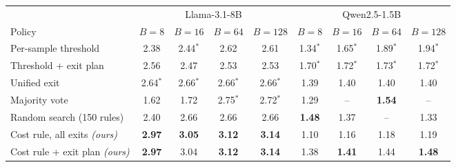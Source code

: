 \begin{tabular}{@{}lcccccccc@{}}
\toprule
 & \multicolumn{4}{c}{Llama-3.1-8B} & \multicolumn{4}{c}{Qwen2.5-1.5B} \\
\cmidrule(lr){2-5}\cmidrule(lr){6-9}
Policy & $B=8$ & $B=16$ & $B=64$ & $B=128$ & $B=8$ & $B=16$ & $B=64$ & $B=128$ \\
\midrule
Per-sample threshold & 2.38 & 2.44$^{*}$ & 2.62 & 2.61 & 1.34$^{*}$ & 1.65$^{*}$ & 1.89$^{*}$ & 1.94$^{*}$ \\
Threshold + exit plan & 2.56 & 2.47 & 2.53 & 2.53 & 1.70$^{*}$ & 1.72$^{*}$ & 1.73$^{*}$ & 1.72$^{*}$ \\
Unified exit & 2.64$^{*}$ & 2.66$^{*}$ & 2.66$^{*}$ & 2.66$^{*}$ & 1.39 & 1.40 & 1.40 & 1.40 \\
Majority vote & 1.62 & 1.72 & 2.75$^{*}$ & 2.72$^{*}$ & 1.29 & -- & \textbf{1.54} & -- \\
Random search (150 rules) & 2.40 & 2.66 & 2.66 & 2.66 & \textbf{1.48} & 1.37 & -- & 1.33 \\
\midrule
Cost rule, all exits \textit{(ours)} & \textbf{2.97} & \textbf{3.05} & \textbf{3.12} & \textbf{3.14} & 1.10 & 1.16 & 1.18 & 1.19 \\
Cost rule + exit plan \textit{(ours)} & \textbf{2.97} & 3.04 & \textbf{3.12} & \textbf{3.14} & 1.38 & \textbf{1.41} & 1.44 & \textbf{1.48} \\
\bottomrule
\end{tabular}
